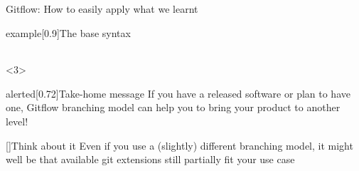 \documentclass[usenames,svgnames,14pt]{beamer}
\begin{document}
\begin{frame}[fragile,c]{Gitflow: How to easily apply what we learnt}
\begin{overlayarea}{\textwidth}{0.88\textheight}
\begin{onlyenv}
\begin{varblock}{example}[0.9\textwidth]{The base syntax}
\begin{tabular}{r@{\;}l}
                \end{tabular}
            \end{varblock}
        \end{onlyenv}
        \begin{onlyenv}<3>
            \begin{varblock}{alerted}[0.72\textwidth]{Take-home message}
                If you have a released software or plan to have one, Gitflow branching model can help you to bring your product to another level!
            \end{varblock}
            \begin{varblock}{}[\textwidth]{Think about it}
                Even if you use a (slightly) different branching model, it might well be that available git extensions still partially fit your use case
            \end{varblock}
        \end{onlyenv}
    \end{overlayarea}
\end{frame}
\end{document}
